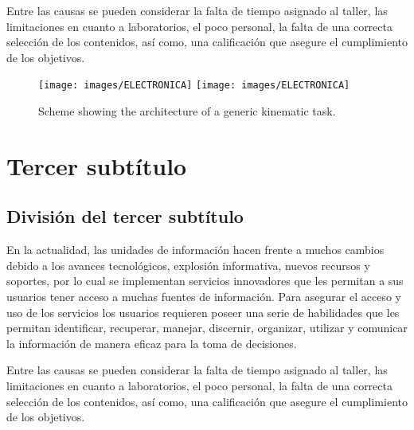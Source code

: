 Entre las causas se pueden considerar la falta de tiempo asignado al taller,
las limitaciones en cuanto a laboratorios, el poco personal, la falta de una
correcta selección de los contenidos, así como, una calificación que asegure el
cumplimiento de los objetivos.

\begin{figure}%
  \centering
  \texttt{[image: images/ELECTRONICA]}
  \texttt{[image: images/ELECTRONICA]}
  \captionsetup{font=footnotesize}
  \caption{Scheme showing the architecture of a generic kinematic task.}
  \label{fig:diagram2}
\end{figure}



\section{Tercer subtítulo}

\subsection{División del tercer subtítulo}

En la actualidad, las unidades de información hacen frente a muchos cambios
debido a los avances tecnológicos, explosión informativa, nuevos recursos y
soportes, por lo cual se implementan servicios innovadores que les permitan a
sus usuarios tener acceso a muchas fuentes de información. Para asegurar el
acceso y uso de los servicios los usuarios requieren poseer una serie de
habilidades que les permitan identificar, recuperar, manejar, discernir,
organizar, utilizar y comunicar la información de manera eficaz para la toma de
decisiones.

Entre las causas se pueden considerar la falta de tiempo asignado al taller,
las limitaciones en cuanto a laboratorios, el poco personal, la falta de una
correcta selección de los contenidos, así como, una calificación que asegure el
cumplimiento de los objetivos.

